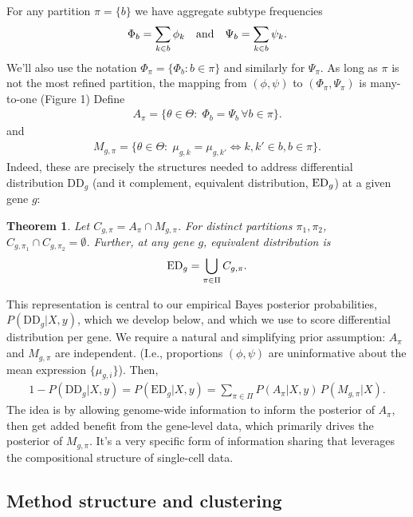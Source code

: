 \documentclass[11pt]{amsart}
\newtheorem{theorem}{Theorem}
\begin{document}
For any partition $\pi=\{b\}$ we have aggregate subtype frequencies
\begin{eqnarray*}
\Phi_b = \sum_{k\in b} \phi_k \quad {\mbox {\rm  and}} \quad 
 \Psi_b = \sum_{k\in b} \psi_k.
\end{eqnarray*}
We'll also use the notation $\Phi_\pi = \{ \Phi_b: b \in \pi \}$ and similarly
for $\Psi_\pi$.   As long as $\pi$ is not the most refined partition,
the mapping from $( \phi, \psi )$ to $( \Phi_\pi, \Psi_\pi)$ is many-to-one (Figure 1)
Define
\begin{eqnarray*}
A_\pi = \{ \theta\in \Theta: \; \Phi_b = \Psi_b  \, \forall b \in \pi \}.
\end{eqnarray*}
and
\begin{eqnarray*}
M_{g,\pi} = \{ \theta \in \Theta: \; \mu_{g,k} = \mu_{g,k'} \iff k,k' \in b, b \in \pi \}.
\end{eqnarray*}
Indeed, these are precisely the
structures needed to address differential distribution DD$_g$ (and
it complement, equivalent distribution, ${\rm ED}_g$) at a given gene
$g$: 

\begin{theorem}  Let $C_{g,\pi} = A_\pi\cap M_{g, \pi}$.  For distinct 
partitions $\pi_1,\pi_2$, $C_{g,\pi_1} \cap C_{g,\pi_2} = \emptyset$. Further,
 at any gene $g$, equivalent distribution is
\begin{eqnarray*}
{\rm{ED}}_g = \bigcup_{\pi \in \Pi} C_{g,\pi}.
\end{eqnarray*}
\end{theorem}
 
This representation is central to our empirical Bayes
posterior probabilities, $P(\text{DD}_g|X,y)$, which we develop below, and
which we use to score differential distribution per gene. We require a natural
and simplifying prior assumption:  $A_\pi$ and $M_{g,\pi}$ are independent.
(I.e., proportions $(\phi,\psi)$ are uninformative about the mean expression
  $\{\mu_{g,i}\}$). Then,
\begin{align}
1-P(\text{DD}_g|X,y) = P(\text{ED}_g|X,y) = \sum_{\pi \in \Pi} P(A_\pi|X,y) \,
P(M_{g,\pi}|X).
\end{align}
The idea is by allowing genome-wide information to inform the posterior of $A_\pi$, then get added benefit from the gene-level data, which primarily drives the posterior of $M_{g,\pi}$. It's a very specific form of information sharing that leverages the compositional structure of single-cell data. 

\subsection{Method structure and clustering}
\end{document}
